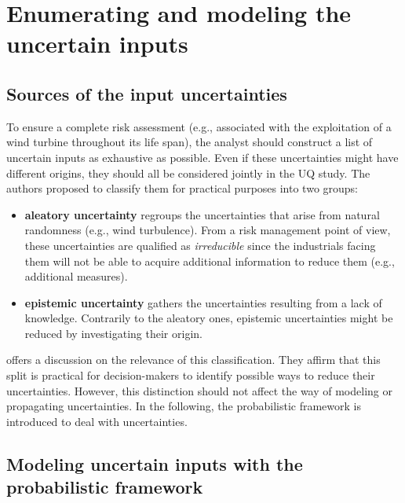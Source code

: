 \section{Enumerating and modeling the uncertain inputs}

\subsection{Sources of the input uncertainties}

To ensure a complete risk assessment (e.g., associated with the exploitation of a wind turbine throughout its life span), the analyst should construct a list of uncertain inputs as exhaustive as possible. 
Even if these uncertainties might have different origins, they should all be considered jointly in the UQ study. 
The authors proposed to classify them for practical purposes into two groups:
\begin{itemize}
    \item \textbf{aleatory uncertainty} regroups the uncertainties that arise from natural randomness (e.g., wind turbulence). 
    From a risk management point of view, these uncertainties are qualified as \textit{irreducible} since the industrials facing them will not be able to acquire additional information to reduce them (e.g., additional measures).     
    \item \textbf{epistemic uncertainty} gathers the uncertainties resulting from a lack of knowledge. 
    Contrarily to the aleatory ones, epistemic uncertainties might be reduced by investigating their origin. 
\end{itemize} 

\citet{kiureghian_2009} offers a discussion on the relevance of this classification. 
They affirm that this split is practical for decision-makers to identify possible ways to reduce their uncertainties. 
However, this distinction should not affect the way of modeling or propagating uncertainties. 
In the following, the probabilistic framework is introduced to deal with uncertainties. 


\subsection{Modeling uncertain inputs with the probabilistic framework}

